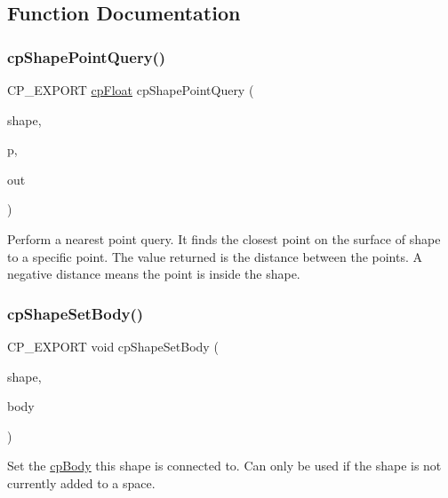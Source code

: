 \subsection{Function Documentation}
\mbox{\label{group__cp_shape_ga5b0f787bc6f0d614d4616c08c807cd6c}} 
\subsubsection{\texorpdfstring{cp\+Shape\+Point\+Query()}{cpShapePointQuery()}}
{\footnotesize\ttfamily C\+P\+\_\+\+E\+X\+P\+O\+RT \mbox{\hyperlink{group__basic_types_gac1ed65573e035bf892505768c852d8d3}{cp\+Float}} cp\+Shape\+Point\+Query (\begin{DoxyParamCaption}\item[{const \mbox{\hyperlink{structcp_shape}{cp\+Shape}} $\ast$}]{shape,  }\item[{\mbox{\hyperlink{structcp_vect}{cp\+Vect}}}]{p,  }\item[{\mbox{\hyperlink{structcp_point_query_info}{cp\+Point\+Query\+Info}} $\ast$}]{out }\end{DoxyParamCaption})}

Perform a nearest point query. It finds the closest point on the surface of shape to a specific point. The value returned is the distance between the points. A negative distance means the point is inside the shape. \mbox{\label{group__cp_shape_ga222501265d75e838459285452a92d6f5}} 
\subsubsection{\texorpdfstring{cp\+Shape\+Set\+Body()}{cpShapeSetBody()}}
{\footnotesize\ttfamily C\+P\+\_\+\+E\+X\+P\+O\+RT void cp\+Shape\+Set\+Body (\begin{DoxyParamCaption}\item[{\mbox{\hyperlink{structcp_shape}{cp\+Shape}} $\ast$}]{shape,  }\item[{\mbox{\hyperlink{structcp_body}{cp\+Body}} $\ast$}]{body }\end{DoxyParamCaption})}

Set the \mbox{\hyperlink{structcp_body}{cp\+Body}} this shape is connected to. Can only be used if the shape is not currently added to a space. 